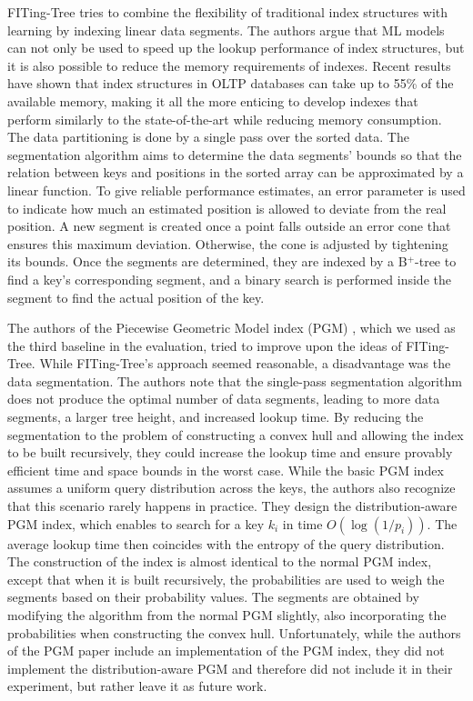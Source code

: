 FITing-Tree \cite{Galakatos2019} tries to combine the ﬂexibility of traditional index structures with learning by indexing linear data segments. The authors argue that ML models can not only be used to speed up the lookup performance of index structures, but it is also possible to reduce the memory requirements of indexes. Recent results \cite{Zhang2016} have shown that index structures in OLTP databases can take up to 55\% of the available memory, making it all the more enticing to develop indexes that perform similarly to the state-of-the-art while reducing memory consumption. The data partitioning is done by a single pass over the sorted data. The segmentation algorithm aims to determine the data segments' bounds so that the relation between keys and positions in the sorted array can be approximated by a linear function. To give reliable performance estimates, an error parameter is used to indicate how much an estimated position is allowed to deviate from the real position. A new segment is created once a point falls outside an error cone that ensures this maximum deviation. Otherwise, the cone is adjusted by tightening its bounds. Once the segments are determined, they are indexed by a B$^+$-tree to find a key's corresponding segment, and a binary search is performed inside the segment to find the actual position of the key.

The authors of the Piecewise Geometric Model index (PGM) \cite{Ferragina:2020pgm}, which we used as the third baseline in the evaluation, tried to improve upon the ideas of FITing-Tree. While FITing-Tree's approach seemed reasonable, a disadvantage was the data segmentation. The authors note that the single-pass segmentation algorithm does not produce the optimal number of data segments, leading to more data segments, a larger tree height, and increased lookup time. By reducing the segmentation to the problem of constructing a convex hull and allowing the index to be built recursively, they could increase the lookup time and ensure provably efficient time and space bounds in the worst case. While the basic PGM index assumes a uniform query distribution across the keys, the authors also recognize that this scenario rarely happens in practice. They design the distribution-aware PGM index, which enables to search for a key $k_i$ in time $O(\log (1/p_i))$. The average lookup time then coincides with the entropy of the query distribution. The construction of the index is almost identical to the normal PGM index, except that when it is built recursively, the probabilities are used to weigh the segments based on their probability values. The segments are obtained by modifying the algorithm from the normal PGM slightly, also incorporating the probabilities when constructing the convex hull. Unfortunately, while the authors of the PGM paper include an implementation of the PGM index, they did not implement the distribution-aware PGM and therefore did not include it in their experiment, but rather leave it as future work. 


